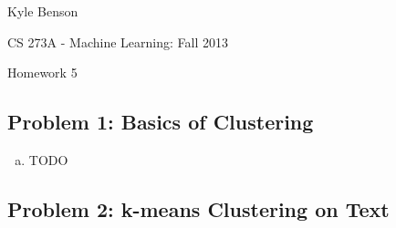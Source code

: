 \documentclass[twoside,11pt]{article}
\newcommand{\figdir}{figs}
\theoremstyle{definition}
\begin{document}
\centerline{\Large Kyle Benson}
\centerline{CS 273A - Machine Learning: Fall 2013}
\centerline{Homework 5}

\subsection*{Problem 1: Basics of Clustering}

\begin{enumerate}[(a)]

\item TODO

\end{enumerate}


\subsection*{Problem 2: k-means Clustering on Text}
\end{document}
